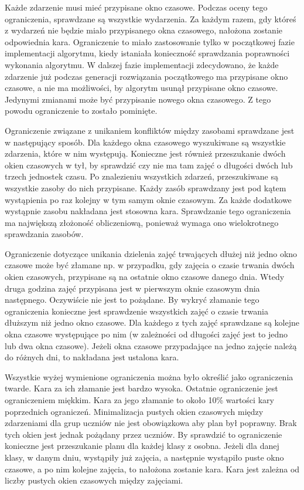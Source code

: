 Każde zdarzenie musi mieć przypisane okno czasowe. Podczas oceny tego ograniczenia, sprawdzane są wszystkie wydarzenia. Za każdym razem, gdy któreś z wydarzeń nie będzie miało przypisanego okna czasowego, nałożona zostanie odpowiednia kara. Ograniczenie to miało zastosowanie tylko w początkowej fazie implementacji algorytmu, kiedy istaniała konieczność sprawdzania poprawności wykonania algorytmu. W dalszej fazie implementacji zdecydowano, że każde zdarzenie już podczas generacji rozwiązania początkowego ma przypisane okno czasowe, a nie ma możliwości, by algorytm usunął przypisane okno czasowe. Jedynymi zmianami może być przypisanie nowego okna czasowego. Z tego powodu ograniczenie to zostało pominięte.

Ograniczenie związane z unikaniem konfliktów między zasobami sprawdzane jest w następujący sposób. Dla każdego okna czasowego wyszukiwane są wszystkie zdarzenia, które w nim występują. Konieczne jest również przeszukanie dwóch okien czasowych w tył, by sprawdzić czy nie ma tam zajęć o długości dwóch lub trzech jednostek czasu. Po znalezieniu wszystkich zdarzeń, przeszukiwane są wszystkie zasoby do nich przypisane. Każdy zasób sprawdzany jest pod kątem wystąpienia po raz kolejny w tym samym oknie czasowym. Za każde dodatkowe wystąpnie zasobu nakładana jest stosowna kara. Sprawdzanie tego ograniczenia ma największą złożoność obliczeniową, ponieważ wymaga ono wielokrotnego sprawdzania zasobów.

Ograniczenie dotyczące unikania dzielenia zajęć trwających dłużej niż jedno okno czasowe może być złamane np. w przypadku, gdy zajęcia o czasie trwania dwóch okien czasowych, przypisane są na ostatnie okno czasowe danego dnia. Wtedy druga godzina zajęć przypisana jest w pierwszym oknie czasowym dnia następnego. Oczywiście nie jest to pożądane. By wykryć złamanie tego ograniczenia konieczne jest sprawdzenie wszystkich zajęć o czasie trwania dłuższym niż jedno okno czasowe. Dla każdego z tych zajęć sprawdzane są kolejne okna czasowe występujące po nim (w zależności od długości zajęć jest to jedno lub dwa okna czasowe). Jeżeli okna czasowe przypadające na jedno zajęcie należą do różnych dni, to nakładana jest ustalona kara.

Wszystkie wyżej wymienione ograniczenia można było określić jako ograniczenia twarde. Kara za ich złamanie jest bardzo wysoka. Ostatnie ograniczenie jest ograniczeniem miękkim. Kara za jego złamanie to około 10\% wartości kary poprzednich ograniczeń. Minimalizacja pustych okien czasowych między zdarzeniami dla grup uczniów nie jest obowiązkowa aby plan był poprawny. Brak tych okien jest jednak pożądany przez uczniów. By sprawdzić to ograniczenie konieczne jest przeszukanie planu dla każdej klasy z osobna. Jeżeli dla danej klasy, w danym dniu, wystąpiły już zajęcia, a następnie wystąpiło puste okno czasowe, a po nim kolejne zajęcia, to nałożona zostanie kara. Kara jest zależna od liczby pustych okien czasowych między zajęciami.

